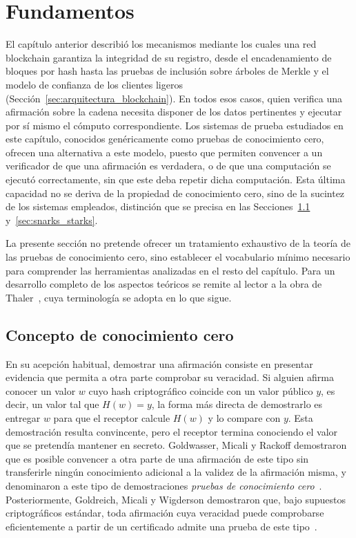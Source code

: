 \section{Fundamentos}
\label{sec:fundamentos_zk}

El capítulo anterior describió los mecanismos mediante los cuales una red blockchain
garantiza la integridad de su registro, desde el encadenamiento de bloques por hash hasta las
pruebas de inclusión sobre árboles de Merkle y el modelo de confianza de los clientes ligeros
(Sección~\ref{sec:arquitectura_blockchain}). En todos esos casos, quien verifica una afirmación
sobre la cadena necesita disponer de los datos pertinentes y ejecutar por sí mismo el cómputo
correspondiente. Los sistemas de prueba estudiados en este capítulo, conocidos genéricamente
como pruebas de conocimiento cero, ofrecen una alternativa a este modelo, puesto que permiten
convencer a un verificador de que una afirmación es verdadera, o de que una computación se
ejecutó correctamente, sin que este deba repetir dicha computación. Esta última capacidad no se
deriva de la propiedad de conocimiento cero, sino de la sucintez de los sistemas empleados,
distinción que se precisa en las Secciones~\ref{sec:nocion_zk} y~\ref{sec:snarks_starks}.

La presente sección no pretende ofrecer un tratamiento exhaustivo de la teoría de las pruebas
de conocimiento cero, sino establecer el vocabulario mínimo necesario para comprender las
herramientas analizadas en el resto del capítulo. Para un desarrollo completo de los aspectos
teóricos se remite al lector a la obra de Thaler~\cite{thaler2022proofs}, cuya terminología se
adopta en lo que sigue.

\subsection{Concepto de conocimiento cero}
\label{sec:nocion_zk}

En su acepción habitual, demostrar una afirmación consiste en presentar evidencia que permita
a otra parte comprobar su veracidad. Si alguien afirma conocer un valor $w$ cuyo hash
criptográfico coincide con un valor público $y$, es decir, un valor tal que $H(w) = y$, la
forma más directa de demostrarlo es entregar $w$ para que el receptor calcule $H(w)$ y lo
compare con $y$. Esta demostración resulta convincente, pero el receptor termina conociendo el
valor que se pretendía mantener en secreto. Goldwasser, Micali y Rackoff demostraron que es
posible convencer a otra parte de una afirmación de este tipo sin transferirle ningún
conocimiento adicional a la validez de la afirmación misma, y denominaron a este tipo de
demostraciones \textit{pruebas de conocimiento cero}~\cite{goldwasser1989knowledge}.
Posteriormente, Goldreich, Micali y Wigderson demostraron que, bajo supuestos criptográficos
estándar, toda afirmación cuya veracidad puede comprobarse eficientemente a partir de un
certificado admite una prueba de este tipo~\cite{goldreich1991proofs}.


